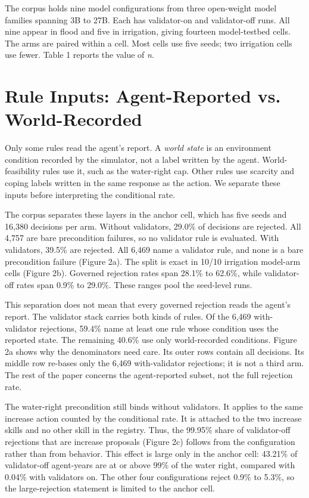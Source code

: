 \documentclass{article}
\begin{document}
The corpus holds nine model configurations from three open-weight model families spanning 3B to 27B. Each has validator-on and validator-off runs. All nine appear in flood and five in irrigation, giving fourteen model-testbed cells. The arms are paired within a cell. Most cells use five seeds; two irrigation cells use fewer. Table 1 reports the value of \textit{n}.

\section{Rule Inputs: Agent-Reported vs. World-Recorded}
Only some rules read the agent's report. A \textit{world state} is an environment condition recorded by the simulator, not a label written by the agent. World-feasibility rules use it, such as the water-right cap. Other rules use scarcity and coping labels written in the same response as the action. We separate these inputs before interpreting the conditional rate.

The corpus separates these layers in the anchor cell, which has five seeds and 16,380 decisions per arm. Without validators, 29.0\% of decisions are rejected. All 4,757 are bare precondition failures, so no validator rule is evaluated. With validators, 39.5\% are rejected. All 6,469 name a validator rule, and none is a bare precondition failure (Figure 2a). The split is exact in 10/10 irrigation model-arm cells (Figure 2b). Governed rejection rates span 28.1\% to 62.6\%, while validator-off rates span 0.9\% to 29.0\%. These ranges pool the seed-level runs.

This separation does not mean that every governed rejection reads the agent's report. The validator stack carries both kinds of rules. Of the 6,469 with-validator rejections, 59.4\% name at least one rule whose condition uses the reported state. The remaining 40.6\% use only world-recorded conditions. Figure 2a shows why the denominators need care. Its outer rows contain all decisions. Its middle row re-bases only the 6,469 with-validator rejections; it is not a third arm. The rest of the paper concerns the agent-reported subset, not the full rejection rate.

The water-right precondition still binds without validators. It applies to the same increase action counted by the conditional rate. It is attached to the two increase skills and no other skill in the registry. Thus, the 99.95\% share of validator-off rejections that are increase proposals (Figure 2c) follows from the configuration rather than from behavior. This effect is large only in the anchor cell: 43.21\% of validator-off agent-years are at or above 99\% of the water right, compared with 0.04\% with validators on. The other four configurations reject 0.9\% to 5.3\%, so the large-rejection statement is limited to the anchor cell.
\end{document}
